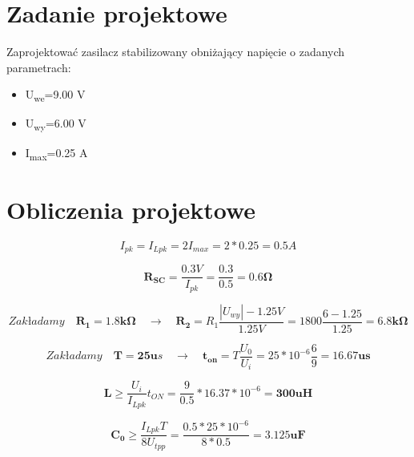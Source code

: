 \documentclass[a4paper,12pt]{article}
\begin{document}
\section{Zadanie projektowe}
Zaprojektować zasilacz stabilizowany obniżający napięcie o zadanych parametrach:
\begin{itemize}
\item U\textsubscript{we}=9.00 V
\item U\textsubscript{wy}=6.00 V
\item I\textsubscript{max}=0.25 A
\end{itemize}
\section{Obliczenia projektowe}

\begin{equation}
I_{pk}=I_{Lpk}=2I_{max}=2*0.25=0.5 A
\end{equation}

\begin{equation}
\mathbf{R_{SC}}=\frac{0.3V}{I_{pk}}=\frac{0.3}{0.5}=\mathbf{0.6 \Omega}
\end{equation}

\begin{equation}
Zakładamy \quad \mathbf{R_1=1.8k\Omega}   \quad \to \quad   \mathbf{R_2}=R_1 \frac {|U_{wy}|-1.25V}{1.25V} = 1800\frac{6-1.25}{1.25}= \mathbf{6.8k \Omega}
\end{equation}

\begin{equation}
Zakładamy \quad \mathbf{T=25u}s \quad \to \quad \mathbf{t_{on}}=T\frac{U_0}{U_i}=25*10^{-6}\frac{6}{9}=\mathbf{16.67us}
\end{equation}

\begin{equation}
\mathbf{L}\geq\frac{U_i}{I_{Lpk}}t_{ON}=\frac{9}{0.5}*16.37*10^{-6}=\mathbf{300uH}
\end{equation}

\begin{equation}
\mathbf{C_0}\geq\frac{I_{Lpk}T}{8U_{tpp}}=\frac{0.5*25*10^{-6}}{8*0.5}=\mathbf{3.125uF}
\end{equation}
\newpage
\end{document}
